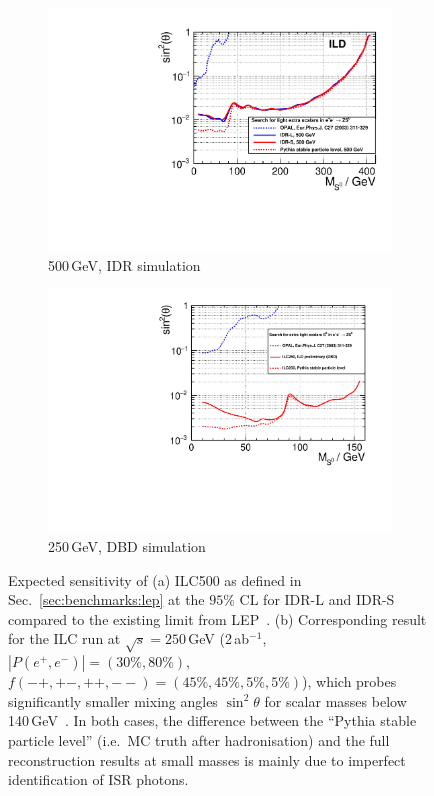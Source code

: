\begin{figure}[htbp]
\begin{center} 
\begin{subfigure}{0.49\hsize} 
 \includegraphics[width=\textwidth]{Performance/fig/exclusion_limits_08_03_compare_LEP.pdf}
 \caption{500\,GeV, IDR simulation\label{fig:extraH:limit:500}}
 \end{subfigure}
\begin{subfigure}{0.49\hsize} 
 \includegraphics[width=\textwidth]{Performance/fig/k95_250.pdf}
 \caption{250\,GeV, DBD simulation\label{fig:extraH:limit:250}}
 \end{subfigure}
\end{center}
\caption{Expected sensitivity of (a) ILC500 as defined in Sec.~\ref{sec:benchmarks:lep} at the $95\%$ CL for IDR-L and IDR-S compared to the existing limit from LEP~\cite{Abbiendi:2002qp}. (b) Corresponding result for the ILC run at $\sqrt{s}=250$\,GeV (2\,ab$^{-1}$, $|P(e^+,e^-)|=(30\%,80\%)$, $f(-+,+-,++,--) = (45\%,45\%, 5\%, 5\%)$), which probes significantly smaller mixing angles $\sin^2{\theta}$ for scalar masses below 140\,GeV~\cite{FIPnote:ESU_BSM}.
In both cases, the difference between the ``Pythia stable particle level'' (i.e.\ MC truth after hadronisation) and the full reconstruction results at small masses is mainly due to imperfect identification of ISR photons.}
\label{fig:extraH:limit}
\end{figure}



